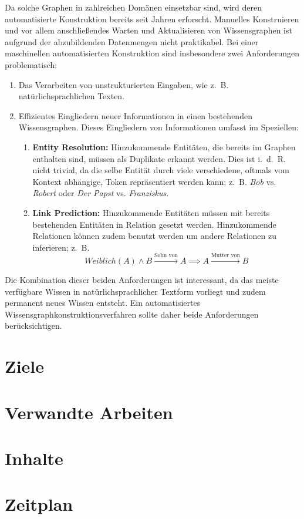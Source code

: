\documentclass[11pt, a4paper]{scrreprt}
\begin{document}
Da solche Graphen in zahlreichen Domänen einsetzbar sind, wird deren automatisierte Konstruktion bereits seit Jahren erforscht.
Manuelles Konstruieren und vor allem anschließendes Warten und Aktualisieren von Wissensgraphen ist aufgrund der abzubildenden Datenmengen nicht praktikabel.
Bei einer maschinellen automatisierten Konstruktion sind insbesondere zwei Anforderungen problematisch:
\begin{enumerate}
	\item Das Verarbeiten von unstrukturierten Eingaben, wie z.~B. natürlichsprachlichen Texten.
	\item Effizientes Eingliedern neuer Informationen in einen bestehenden Wissensgraphen.
		Dieses Eingliedern von Informationen umfasst im Speziellen:
		\begin{enumerate}
			\item \textbf{Entity Resolution:}
				Hinzukommende Entitäten, die bereits im Graphen enthalten sind, müssen als Duplikate erkannt werden.
				Dies ist i.~d.~R. nicht trivial, da die selbe Entität durch viele verschiedene, oftmals vom Kontext abhängige, Token repräsentiert werden kann;
				z.~B. \textit{Bob} vs. \textit{Robert} oder \textit{Der Papst} vs. \textit{Franziskus}.
			\item \textbf{Link Prediction:}
				Hinzukommende Entitäten müssen mit bereits bestehenden Entitäten in Relation gesetzt werden.
				Hinzukommende Relationen können zudem benutzt werden um andere Relationen zu inferieren;
				z.~B. $$Weiblich(A) \land B \xrightarrow{\text{Sohn~von}} A \implies A \xrightarrow{\text{Mutter~von}} B$$
		\end{enumerate}
\end{enumerate}

Die Kombination dieser beiden Anforderungen ist interessant, da das meiste verfügbare Wissen in natürlichsprachlicher Textform vorliegt und zudem permanent neues Wissen entsteht.
Ein automatisiertes Wissensgraphkonstruktionsverfahren sollte daher beide Anforderungen berücksichtigen.

\section{Ziele}

\section{Verwandte Arbeiten}

\section{Inhalte}

\section{Zeitplan}
\end{document}
